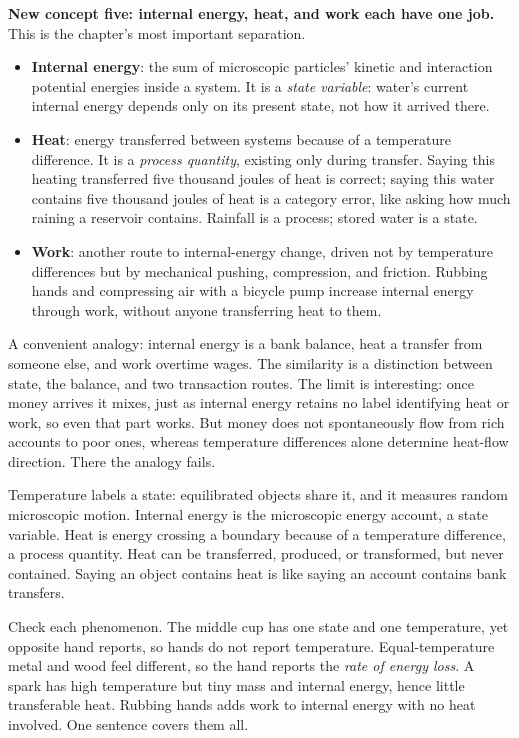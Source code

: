\begin{mainline}
\textbf{New concept five: internal energy, heat, and work each have one job.} This is the chapter's most important separation.
\begin{itemize}[leftmargin=1.8em]
\item \textbf{Internal energy}: the sum of microscopic particles' kinetic and interaction potential energies inside a system. It is a \emph{state variable}: water's current internal energy depends only on its present state, not how it arrived there.
\item \textbf{Heat}: energy transferred between systems because of a temperature difference. It is a \emph{process quantity}, existing only during transfer. Saying this heating transferred five thousand joules of heat is correct; saying this water contains five thousand joules of heat is a category error, like asking how much raining a reservoir contains. Rainfall is a process; stored water is a state.
\item \textbf{Work}: another route to internal-energy change, driven not by temperature differences but by mechanical pushing, compression, and friction. Rubbing hands and compressing air with a bicycle pump increase internal energy through work, without anyone transferring heat to them.
\end{itemize}
A convenient analogy: internal energy is a bank balance, heat a transfer from someone else, and work overtime wages. The similarity is a distinction between state, the balance, and two transaction routes. The limit is interesting: once money arrives it mixes, just as internal energy retains no label identifying heat or work, so even that part works. But money does not spontaneously flow from rich accounts to poor ones, whereas temperature differences alone determine heat-flow direction. There the analogy fails.
\end{mainline}


\begin{oneline}
Temperature labels a state: equilibrated objects share it, and it measures random microscopic motion. Internal energy is the microscopic energy account, a state variable. Heat is energy crossing a boundary because of a temperature difference, a process quantity. Heat can be transferred, produced, or transformed, but never contained. Saying an object contains heat is like saying an account contains bank transfers.
\end{oneline}

Check each phenomenon. The middle cup has one state and one temperature, yet opposite hand reports, so hands do not report temperature. Equal-temperature metal and wood feel different, so the hand reports the \emph{rate of energy loss}. A spark has high temperature but tiny mass and internal energy, hence little transferable heat. Rubbing hands adds work to internal energy with no heat involved. One sentence covers them all.

